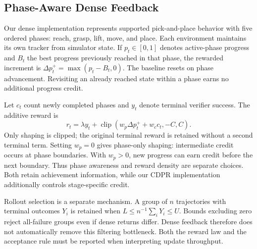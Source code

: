 \subsection{Phase-Aware Dense Feedback}\label{sec:dense_method}
Our dense implementation represents supported pick-and-place behavior with five ordered phases: reach, grasp, lift, move, and place. Each environment maintains its own tracker from simulator state. If $p_t\in[0,1]$ denotes active-phase progress and $B_t$ the best progress previously reached in that phase, the rewarded increment is $\Delta p_t^+=\max(p_t-B_t,0)$. The baseline resets on phase advancement. Revisiting an already reached state within a phase earns no additional progress credit.

Let $c_t$ count newly completed phases and $y_t$ denote terminal verifier success. The additive reward is
\begin{equation}
r_t=\lambda y_t+\operatorname{clip}(w_p\Delta p_t^++w_c c_t,-C,C).
\label{eq:dense}
\end{equation}
Only shaping is clipped; the original terminal reward is retained without a second terminal term. Setting $w_p=0$ gives phase-only shaping: intermediate credit occurs at phase boundaries. With $w_p>0$, new progress can earn credit before the next boundary. Thus phase awareness and reward density are separate choices. Both retain achievement information, while our CDPR implementation additionally controls stage-specific credit. 

Rollout selection is a separate mechanism. A group of $n$ trajectories with terminal outcomes $Y_i$ is retained when $L\le n^{-1}\sum_iY_i\le U$. Bounds excluding zero reject all-failure groups even if dense returns differ. Dense feedback therefore does not automatically remove this filtering bottleneck. Both the reward law and the acceptance rule must be reported when interpreting update throughput.
